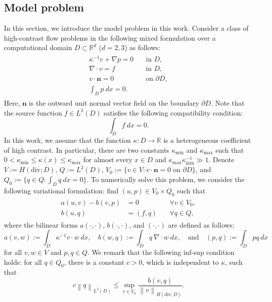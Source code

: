 \documentclass{article}[11pt]
\theoremstyle{definition}
\newcommand{\prnt}[1]{\left( #1 \right)}
\newcommand{\norm}[1]{\left\|#1\right\|}
\newcommand{\normL}[2]{\norm{#1}_{L^2\prnt{#2}}}
\begin{document}
\subsection{Model problem}
In this section, we introduce the model problem in this work. 
Consider a class of high-contrast flow problems in the following mixed formulation over a computational domain $D \subset \mathbb{R}^d$ ($d =2, 3$) as follows:
\begin{eqnarray}
\begin{split}
\kappa^{-1} v + \nabla p = 0 & \quad \text{in } D, \\
\nabla \cdot v = f & \quad \text{in } D, \\
v \cdot \mathbf{n} = 0 & \quad \text{on } \partial D, \\
\int_D p ~ dx = 0.
\end{split}
\label{eqn:flow}
\end{eqnarray}
Here, $\mathbf{n}$ is the outward unit normal vector field on the boundary $\partial D$. Note that the source function $f \in L^2(D)$ satisfies the following compatibility condition:
$$ \int_D f ~ dx = 0.$$
In this work, we assume that the function $\kappa : D \to \mathbb{R}$ is a heterogeneous coefficient of high contrast. In particular, there are two constants $\kappa_{\min}$ and $\kappa_{\max}$ such that $0< \kappa_{\min} \leq \kappa(x) \leq \kappa_{\max}$ for almost every $x \in D$ and 
$\kappa_{\max}\kappa_{\min}^{-1} \gg 1$. 
Denote $V := H (\text{div};D)$, $Q:= L^2(D)$, $V_0 := \{ v \in V: v \cdot \mathbf{n} = 0 \text{ on } \partial D\}$, and $Q_0 := \{ q \in Q: \int_D q ~ dx = 0\}$. To numerically solve this problem, we consider the following variational formulation: find $(u , p) \in V_0 \times Q_0$ such that 
\begin{eqnarray}
\begin{split}
a(u,v) - b(v,p) &= 0 & \quad \forall v \in V_0, \\
b(u,q) &= (f,q) & \quad \forall q \in Q, 
\end{split}
\label{eqn:model_var}
\end{eqnarray}
where the bilinear forms $a(\cdot,\cdot)$, $b(\cdot,\cdot)$, and $(\cdot,\cdot)$ are defined as follows:
$$ a(v,w) := \int_D \kappa^{-1} v \cdot w ~ dx, \quad b(w,q) :=  \int_D q ~ \nabla \cdot w~ dx, \quad \text{and} \quad (p,q) := \int_D pq ~ dx$$
for all $v, w \in V$ and $p, q \in Q$. We remark that the following inf-sup condition holds: for all $q \in Q_0$, there is a constant $c>0$, which is independent to $\kappa$, such that 
$$ c \normL{q}{D} \leq \sup_{v \in V_0} \frac{b(v,q)}{\norm{v}_{H(\text{div};D)}}.$$
\end{document}
